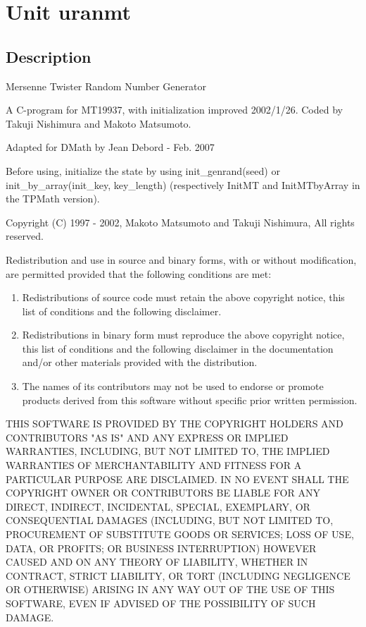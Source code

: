 \documentclass[12pt,a4paper,oneside]{report}
\begin{document}
\section{Unit uranmt}
\label{uranmt}
\subsection{Description}
Mersenne Twister Random Number Generator 

A C{-}program for MT19937, with initialization improved 2002/1/26. Coded by Takuji Nishimura and Makoto Matsumoto.

Adapted for DMath by Jean Debord {-} Feb. 2007

Before using, initialize the state by using init{\_}genrand(seed) or init{\_}by{\_}array(init{\_}key, key{\_}length) (respectively InitMT and InitMTbyArray in the TPMath version).

Copyright (C) 1997 {-} 2002, Makoto Matsumoto and Takuji Nishimura, All rights reserved.

Redistribution and use in source and binary forms, with or without modification, are permitted provided that the following conditions are met:
\begin{enumerate}
	\item Redistributions of source code must retain the above copyright notice, this list of conditions and the following disclaimer.
	
	\item Redistributions in binary form must reproduce the above copyright notice, this list of conditions and the following disclaimer in the documentation and/or other materials provided with the distribution.
	
	\item The names of its contributors may not be used to endorse or promote products derived from this software without specific prior written permission.
\end{enumerate}
THIS SOFTWARE IS PROVIDED BY THE COPYRIGHT HOLDERS AND CONTRIBUTORS "AS IS" AND ANY EXPRESS OR IMPLIED WARRANTIES, INCLUDING, BUT NOT LIMITED TO, THE IMPLIED WARRANTIES OF MERCHANTABILITY AND FITNESS FOR A PARTICULAR PURPOSE ARE DISCLAIMED. IN NO EVENT SHALL THE COPYRIGHT OWNER OR CONTRIBUTORS BE LIABLE FOR ANY DIRECT, INDIRECT, INCIDENTAL, SPECIAL, EXEMPLARY, OR CONSEQUENTIAL DAMAGES (INCLUDING, BUT NOT LIMITED TO, PROCUREMENT OF SUBSTITUTE GOODS OR SERVICES; LOSS OF USE, DATA, OR PROFITS; OR BUSINESS INTERRUPTION) HOWEVER CAUSED AND ON ANY THEORY OF LIABILITY, WHETHER IN CONTRACT, STRICT LIABILITY, OR TORT (INCLUDING NEGLIGENCE OR OTHERWISE) ARISING IN ANY WAY OUT OF THE USE OF THIS SOFTWARE, EVEN IF ADVISED OF THE POSSIBILITY OF SUCH DAMAGE.
\end{document}

